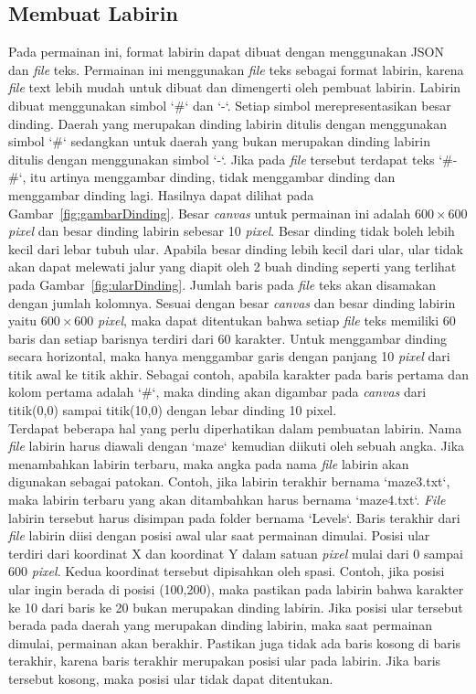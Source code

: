 \subsection{Membuat Labirin}
Pada permainan ini, format labirin dapat dibuat dengan menggunakan JSON dan \textit{file} teks. Permainan ini menggunakan \textit{file} teks sebagai format labirin, karena \textit{file} text lebih mudah untuk dibuat dan dimengerti oleh pembuat labirin. Labirin dibuat menggunakan simbol `\#` dan `-`. Setiap simbol merepresentasikan besar dinding. Daerah yang merupakan dinding labirin ditulis dengan menggunakan simbol `\#` sedangkan untuk daerah yang bukan merupakan dinding labirin ditulis dengan menggunakan simbol `-`. Jika pada \textit{file} tersebut terdapat teks `\#-\#`, itu artinya menggambar dinding, tidak menggambar dinding dan menggambar dinding lagi. Hasilnya dapat dilihat pada Gambar~\ref{fig:gambarDinding}. Besar \textit{canvas} untuk permainan ini adalah $600 \times 600$ \textit{pixel} dan besar dinding labirin sebesar 10 \textit{pixel}. Besar dinding tidak boleh lebih kecil dari lebar tubuh ular. Apabila besar dinding lebih kecil dari ular, ular tidak akan dapat melewati jalur yang diapit oleh 2 buah dinding seperti yang terlihat pada Gambar~\ref{fig:ularDinding}. Jumlah baris pada \textit{file} teks akan disamakan dengan jumlah kolomnya. Sesuai dengan besar \textit{canvas} dan besar dinding labirin yaitu $600 \times 600$ \textit{pixel}, maka dapat ditentukan bahwa setiap \textit{file} teks memiliki 60 baris dan setiap barisnya terdiri dari 60 karakter. Untuk menggambar dinding secara horizontal, maka hanya menggambar garis dengan panjang 10 \textit{pixel} dari titik awal ke titik akhir. Sebagai contoh, apabila karakter pada baris pertama dan kolom pertama adalah `\#`, maka dinding akan digambar pada \textit{canvas} dari titik(0,0) sampai titik(10,0) dengan lebar dinding 10 pixel.\\ 

Terdapat beberapa hal yang perlu diperhatikan dalam pembuatan labirin. Nama \textit{file} labirin harus diawali dengan `maze` kemudian diikuti oleh sebuah angka. Jika menambahkan labirin terbaru, maka angka pada nama \textit{file} labirin akan digunakan sebagai patokan. Contoh, jika labirin terakhir bernama `maze3.txt`, maka labirin terbaru yang akan ditambahkan harus bernama `maze4.txt`. \textit{File} labirin tersebut harus disimpan pada folder bernama `Levels`. Baris terakhir dari \textit{file} labirin diisi dengan posisi awal ular saat permainan dimulai. Posisi ular terdiri dari koordinat X dan koordinat Y dalam satuan \textit{pixel} mulai dari 0 sampai 600 \textit{pixel}. Kedua koordinat tersebut dipisahkan oleh spasi. Contoh, jika posisi ular ingin berada di posisi (100,200), maka pastikan pada labirin bahwa karakter ke 10 dari baris ke 20 bukan merupakan dinding labirin. Jika posisi ular tersebut berada pada daerah yang merupakan dinding labirin, maka saat permainan dimulai, permainan akan berakhir. Pastikan juga tidak ada baris kosong di baris terakhir, karena baris terakhir merupakan posisi ular pada labirin. Jika baris tersebut kosong, maka posisi ular tidak dapat ditentukan.\\

